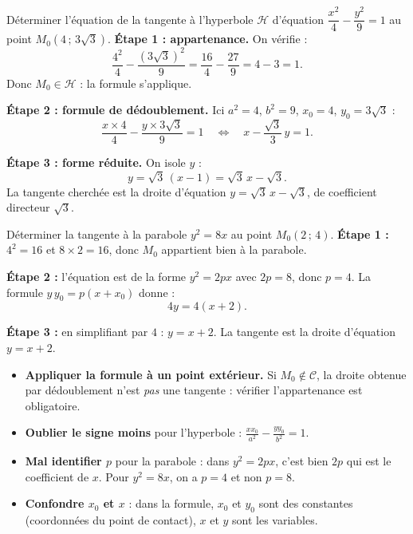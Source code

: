 \documentclass[11pt]{article}
\begin{document}
\begin{exoresolu}
Déterminer l'équation de la tangente à l'hyperbole $\mathcal{H}$ d'équation $\dfrac{x^2}{4}-\dfrac{y^2}{9}=1$ au point $M_0\left(4\,;\,3\sqrt{3}\right)$.
\tcblower
\textbf{Étape 1 : appartenance.} On vérifie :
\[ \frac{4^2}{4}-\frac{(3\sqrt{3})^2}{9}=\frac{16}{4}-\frac{27}{9}=4-3=1. \]
Donc $M_0\in\mathcal{H}$ : la formule s'applique.

\textbf{Étape 2 : formule de dédoublement.} Ici $a^2=4$, $b^2=9$, $x_0=4$, $y_0=3\sqrt{3}$ :
\[ \frac{x\times 4}{4}-\frac{y\times 3\sqrt{3}}{9}=1
\quad\Longleftrightarrow\quad
x-\frac{\sqrt{3}}{3}\,y=1. \]

\textbf{Étape 3 : forme réduite.} On isole $y$ :
\[ y=\sqrt{3}\,(x-1)=\sqrt{3}\,x-\sqrt{3}. \]
La tangente cherchée est la droite d'équation $y=\sqrt{3}\,x-\sqrt{3}$, de coefficient directeur $\sqrt{3}$.
\end{exoresolu}

\begin{exoresolu}
Déterminer la tangente à la parabole $y^2=8x$ au point $M_0(2\,;\,4)$.
\tcblower
\textbf{Étape 1 :} $4^2=16$ et $8\times 2=16$, donc $M_0$ appartient bien à la parabole.

\textbf{Étape 2 :} l'équation est de la forme $y^2=2px$ avec $2p=8$, donc $p=4$. La formule $y\,y_0=p(x+x_0)$ donne :
\[ 4y=4(x+2). \]

\textbf{Étape 3 :} en simplifiant par $4$ : $y=x+2$. La tangente est la droite d'équation $y=x+2$.
\end{exoresolu}

\begin{attention}
\begin{itemize}
\item \textbf{Appliquer la formule à un point extérieur.} Si $M_0\notin\mathcal{C}$, la droite obtenue par dédoublement n'est \emph{pas} une tangente : vérifier l'appartenance est obligatoire.
\item \textbf{Oublier le signe moins} pour l'hyperbole : $\frac{x x_0}{a^2}-\frac{y y_0}{b^2}=1$.
\item \textbf{Mal identifier $p$} pour la parabole : dans $y^2=2px$, c'est bien $2p$ qui est le coefficient de $x$. Pour $y^2=8x$, on a $p=4$ et non $p=8$.
\item \textbf{Confondre $x_0$ et $x$} : dans la formule, $x_0$ et $y_0$ sont des constantes (coordonnées du point de contact), $x$ et $y$ sont les variables.
\end{itemize}
\end{attention}
\end{document}

